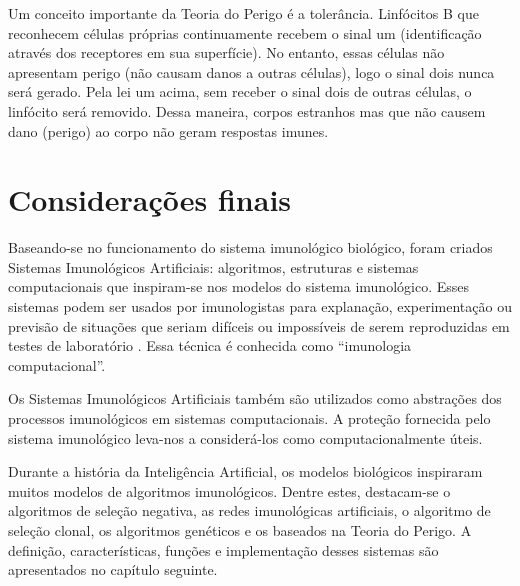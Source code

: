 Um conceito importante da Teoria do Perigo é a tolerância. Linfócitos B que reconhecem células próprias continuamente recebem o sinal um (identificação através dos receptores em sua superfície). No entanto, essas células não apresentam perigo (não causam danos a outras células), logo o sinal dois nunca será gerado. Pela lei um acima, sem receber o sinal dois de outras células, o linfócito será removido. Dessa maneira, corpos estranhos mas que não causem dano (perigo) ao corpo não geram respostas imunes.

\section{Considerações finais}

Baseando-se no funcionamento do sistema imunológico biológico, foram criados Sistemas Imunológicos Artificiais: algoritmos, estruturas e sistemas computacionais que inspiram-se nos modelos do sistema imunológico. Esses sistemas podem ser usados por imunologistas para explanação, experimentação ou previsão de situações que seriam difíceis ou impossíveis de serem reproduzidas em testes de laboratório \cite{Garrett2005}. Essa técnica é conhecida como ``imunologia computacional''.

Os Sistemas Imunológicos Artificiais também são utilizados como abstrações dos processos imunológicos em sistemas computacionais. A proteção fornecida pelo sistema imunológico leva-nos a considerá-los como computacionalmente úteis.

Durante a história da Inteligência Artificial, os modelos biológicos inspiraram muitos modelos de algoritmos imunológicos. Dentre estes, destacam-se o algoritmos de seleção negativa, as redes imunológicas artificiais, o algoritmo de seleção clonal, os algoritmos genéticos e os baseados na Teoria do Perigo. A definição, características, funções e implementação desses sistemas são apresentados no capítulo seguinte.
